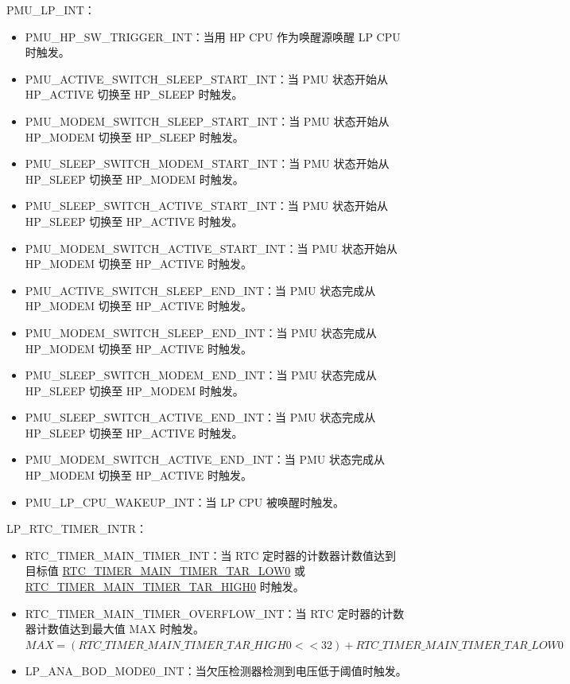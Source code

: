 \documentclass[main\_\_CN.tex]{subfiles}
\begin{document}
PMU\_LP\_INT：

\begin{itemize}
\item \label{int:PMUHPSWTRIGGERINT}PMU\_HP\_SW\_TRIGGER\_INT：当用 HP CPU 作为唤醒源唤醒 LP CPU 时触发。

\item \label{int:PMUACTIVESWITCHSLEEPSTARTINT}PMU\_ACTIVE\_SWITCH\_SLEEP\_START\_INT：当 PMU 状态开始从 HP\_ACTIVE 切换至 HP\_SLEEP 时触发。
\item \label{int:PMUMODEMSWITCHSLEEPSTARTINT}PMU\_MODEM\_SWITCH\_SLEEP\_START\_INT：当 PMU 状态开始从 HP\_MODEM 切换至 HP\_SLEEP 时触发。
\item \label{int:PMUSLEEPSWITCHMODEMSTARTINT}PMU\_SLEEP\_SWITCH\_MODEM\_START\_INT：当 PMU 状态开始从 HP\_SLEEP 切换至 HP\_MODEM 时触发。
\item \label{int:PMUSLEEPSWITCHACTIVESTARTINT}PMU\_SLEEP\_SWITCH\_ACTIVE\_START\_INT：当 PMU 状态开始从 HP\_SLEEP 切换至 HP\_ACTIVE 时触发。
\item \label{int:PMUMODEMSWITCHACTIVESTARTINT}PMU\_MODEM\_SWITCH\_ACTIVE\_START\_INT：当 PMU 状态开始从 HP\_MODEM 切换至 HP\_ACTIVE 时触发。
\item \label{int:PMUACTIVESWITCHSLEEPENDINT}PMU\_ACTIVE\_SWITCH\_SLEEP\_END\_INT：当 PMU 状态完成从 HP\_MODEM 切换至 HP\_ACTIVE 时触发。
\item \label{int:PMUMODEMSWITCHSLEEPENDINT}PMU\_MODEM\_SWITCH\_SLEEP\_END\_INT：当 PMU 状态完成从 HP\_MODEM 切换至 HP\_ACTIVE 时触发。
\item \label{int:PMUSLEEPSWITCHMODEMENDINT}PMU\_SLEEP\_SWITCH\_MODEM\_END\_INT：当 PMU 状态完成从 HP\_SLEEP 切换至 HP\_MODEM 时触发。
\item \label{int:PMUSLEEPSWITCHACTIVEENDINT}PMU\_SLEEP\_SWITCH\_ACTIVE\_END\_INT：当 PMU 状态完成从 HP\_SLEEP 切换至 HP\_ACTIVE 时触发。
\item \label{int:PMUMODEMSWITCHACTIVEENDINT}PMU\_MODEM\_SWITCH\_ACTIVE\_END\_INT：当 PMU 状态完成从 HP\_MODEM 切换至 HP\_ACTIVE 时触发。
\item \label{int:PMULPCPUWAKEUPINT}PMU\_LP\_CPU\_WAKEUP\_INT：当 LP CPU 被唤醒时触发。
\end{itemize}

LP\_RTC\_TIMER\_INTR：
\begin{itemize}
\item \label{int:RTCTIMERMAINTIMERINT}RTC\_TIMER\_MAIN\_TIMER\_INT：当 RTC 定时器的计数器计数值达到目标值 \hyperref[fielddesc:RTCTIMERMAINTIMERTARLOW0]{RTC\_TIMER\_MAIN\_TIMER\_TAR\_LOW0} 或 \hyperref[fielddesc:RTCTIMERMAINTIMERTARHIGH0]{RTC\_TIMER\_MAIN\_TIMER\_TAR\_HIGH0} 时触发。
\item \label{int:RTCTIMERMAINTIMEROVERFLOWINT}RTC\_TIMER\_MAIN\_TIMER\_OVERFLOW\_INT：当 RTC 定时器的计数器计数值达到最大值 MAX 时触发。\\
$MAX = (\hyperref[fielddesc:RTCTIMERMAINTIMERTARHIGH0]{RTC\_TIMER\_MAIN\_TIMER\_TAR\_HIGH0} << 32) + \hyperref[fielddesc:RTCTIMERMAINTIMERTARLOW0]{RTC\_TIMER\_MAIN\_TIMER\_TAR\_LOW0}$

\item \label{int:LPANABODMODE0INT}LP\_ANA\_BOD\_MODE0\_INT：当欠压检测器检测到电压低于阈值时触发。
\end{itemize}
\end{document}
